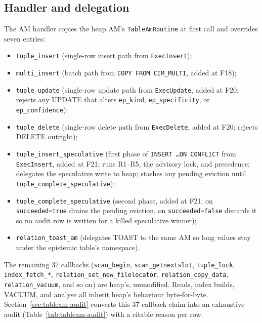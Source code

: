 \documentclass[sigconf, nonacm]{acmart}
\begin{document}
\subsection{Handler and delegation}
The AM handler copies the heap AM's \texttt{TableAmRoutine} at first call and overrides seven entries:
\begin{itemize}
\item \texttt{tuple\_insert} (single-row insert path from \texttt{ExecInsert});
\item \texttt{multi\_insert} (batch path from \texttt{COPY FROM CIM\_MULTI}, added at F18);
\item \texttt{tuple\_update} (single-row update path from \texttt{ExecUpdate}, added at F20; rejects any UPDATE that alters \texttt{ep\_kind}, \texttt{ep\_specificity}, or \texttt{ep\_confidence});
\item \texttt{tuple\_delete} (single-row delete path from \texttt{ExecDelete}, added at F20; rejects DELETE outright);
\item \texttt{tuple\_insert\_speculative} (first phase of \texttt{INSERT \dots ON CONFLICT} from \texttt{ExecInsert}, added at F21; runs R1--R5, the advisory lock, and precedence; delegates the speculative write to heap; stashes any pending eviction until \texttt{tuple\_complete\_speculative});
\item \texttt{tuple\_complete\_speculative} (second phase, added at F21; on \texttt{succeeded=true} drains the pending eviction, on \texttt{succeeded=false} discards it so no audit row is written for a killed speculative winner);
\item \texttt{relation\_toast\_am} (delegates TOAST to the same AM so long values stay under the epistemic table's namespace).
\end{itemize}
The remaining 37 callbacks (\texttt{scan\_begin}, \texttt{scan\_getnextslot}, \texttt{tuple\_lock}, \texttt{index\_fetch\_*}, \texttt{relation\_set\_new\_filelocator}, \texttt{relation\_copy\_data}, \texttt{relation\_vacuum}, and so on) are heap's, unmodified. Reads, index builds, VACUUM, and analyse all inherit heap's behaviour byte-for-byte. Section~\ref{sec:tableam-audit} converts this 37-callback claim into an exhaustive audit (Table~\ref{tab:tableam-audit}) with a citable reason per row.
\end{document}
